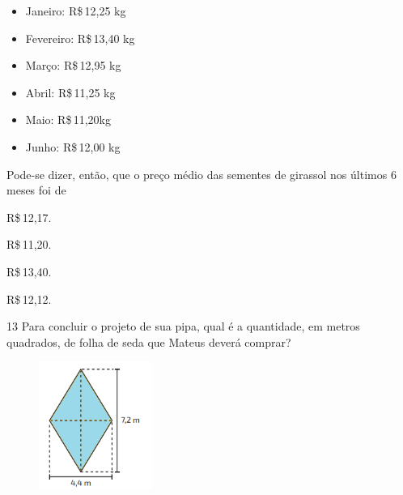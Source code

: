 \begin{itemize}
\item Janeiro: R\$\,12,25 kg
\item Fevereiro: R\$\,13,40 kg
\item Março: R\$\,12,95 kg
\item Abril: R\$\,11,25 kg
\item Maio: R\$\,11,20kg
\item Junho: R\$\,12,00 kg
\end{itemize}

Pode-se dizer, então, que o preço médio das sementes de girassol nos
últimos 6 meses foi de

\begin{escolha}
\item R\$\,12,17.
\item R\$\,11,20.
\item R\$\,13,40.
\item R\$\,12,12.
\end{escolha}









\pagebreak

\num{13} Para concluir o projeto de sua pipa, qual é a quantidade, em metros quadrados, de
folha de seda que Mateus deverá comprar?

\begin{figure}[H]
\centering\includegraphics[width=1.45833in,height=1.63333in]{./imgSAEB_8_MAT/media/image59.png}
\end{figure}

